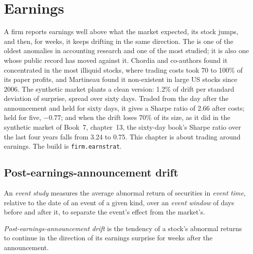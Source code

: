 \chapter{Earnings}\label{ch:s1:earnings}

A firm reports earnings well above what the market expected, its stock jumps, and then, for weeks, it keeps drifting in the same direction. The
 is one of the oldest anomalies in accounting research and one of the most studied; it is also one whose public record
has moved against it. Chordia and co-authors found it concentrated in the most illiquid stocks, where trading costs took 70 to 100\% of its paper profits,
and Martineau found it non-existent in large US stocks since 2006. The synthetic market plants a clean version: 1.2\% of drift per standard deviation of
surprise, spread over sixty days. Traded from the day after the announcement and held for sixty days, it gives a Sharpe ratio of 2.66 after costs; held for
five, $-0.77$; and when the drift loses 70\% of its size, as it did in the synthetic market of Book~7, chapter~13, the sixty-day book's Sharpe ratio over the
last four years falls from 3.24 to 0.75. This chapter is about trading around earnings. The build is \texttt{firm.earnstrat}.

\section{Post-earnings-announcement drift}

\begin{definition}\label{def:s1:earnings:event}
An \emph{event study} measures the average abnormal return of securities in \emph{event time}, relative to the date of an event of a
given kind, over an \emph{event window} of days before and after it, to separate the event's effect from the market's.
\end{definition}

\begin{definition}\label{def:s1:earnings:pead}
\emph{Post-earnings-announcement drift} is the tendency of a stock's abnormal returns to continue in the direction of
its earnings surprise for weeks after the announcement.
\end{definition}

